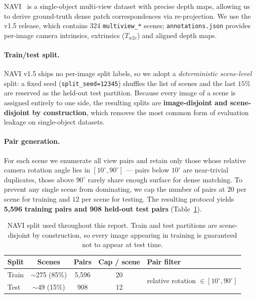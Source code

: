 \documentclass[11pt,a4paper]{article}
\begin{document}
NAVI~\cite{navi} is a single-object multi-view dataset with precise depth maps, allowing us to derive
ground-truth dense patch correspondences via re-projection. We use the v1.5 release, which contains
324 \texttt{multiview\_*} scenes; \texttt{annotations.json} provides per-image camera intrinsics,
extrinsics ($T_{w2c}$) and aligned depth maps.

\paragraph{Train/test split.} NAVI v1.5 ships no per-image split labels, so we adopt a
\emph{deterministic scene-level} split: a fixed seed (\texttt{split\_seed=12345}) shuffles the list
of scenes and the last $15\%$ are reserved as the held-out test partition. Because every image of a
scene is assigned entirely to one side, the resulting splits are \textbf{image-disjoint and
scene-disjoint by construction}, which removes the most common form of evaluation leakage on
single-object datasets.

\paragraph{Pair generation.} For each scene we enumerate all view pairs and retain only those whose
relative camera rotation angle lies in $[10^\circ, 90^\circ]$ --- pairs below $10^\circ$ are
near-trivial duplicates, those above $90^\circ$ rarely share enough surface for dense matching. To
prevent any single scene from dominating, we cap the number of pairs at $20$ per scene for training
and $12$ per scene for testing. The resulting protocol yields
\textbf{5{,}596 training pairs and 908 held-out test pairs} (Table~\ref{tab:split}).

\begin{table}[H]
\centering\small
\caption{NAVI split used throughout this report. Train and test partitions are scene-disjoint by
construction, so every image appearing in training is guaranteed not to appear at test time.}
\label{tab:split}
\begin{tabular}{@{}lcccl@{}}
\toprule
\textbf{Split} & \textbf{Scenes} & \textbf{Pairs} & \textbf{Cap / scene} & \textbf{Pair filter} \\
\midrule
Train & $\sim$275 (85\%) & 5{,}596 & 20 & \multirow{2}{*}{relative rotation $\in [10^\circ, 90^\circ]$} \\
Test  & $\sim$49  (15\%) & 908     & 12 & \\
\bottomrule
\end{tabular}
\end{table}
\end{document}
